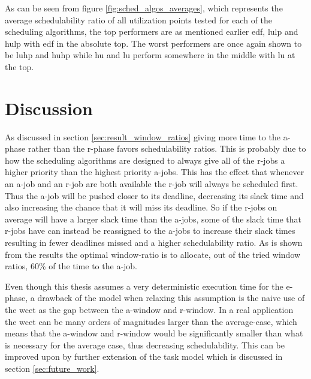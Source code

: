 \documentclass{kththesis}
\begin{document}
As can be seen from figure \ref{fig:sched_algos_averages}, which represents the average
schedulability ratio of all utilization points tested for each of the scheduling algorithms, the top
performers are as mentioned earlier \acrshort{edf}, \acrshort{lulp} and \acrshort{hulp} with
\acrshort{edf} in the absolute top. The worst performers are once again shown to be \acrshort{luhp}
and \acrshort{huhp} while \acrshort{hu} and \acrshort{lu} perform somewhere in the middle with \acrshort{lu}
at the top.


\chapter{Discussion} \label{ch:discussion}

As discussed in section \ref{sec:result_window_ratios} giving more time to the \acrshort{a}-phase
rather than the \acrshort{r}-phase favors schedulability ratios. This is probably due to how the
scheduling algorithms are designed to always give all of the \acrshort{r}-jobs a higher
priority than the highest priority \acrshort{a}-jobs. This has the effect that whenever an
\acrshort{a}-job and an \acrshort{r}-job are both available the \acrshort{r}-job will always be
scheduled first. Thus the \acrshort{a}-job will be pushed closer to its deadline, decreasing its
slack time and also increasing the chance that it will miss its deadline. So if the
\acrshort{r}-jobs on average will have a larger slack time than the \acrshort{a}-jobs, some of the
slack time that \acrshort{r}-jobs have can instead be reassigned to the \acrshort{a}-jobs to
increase their slack times resulting in fewer deadlines missed and a higher schedulability ratio. As
is shown from the results the optimal window-ratio is to allocate, out of the tried window ratios,
60\% of the time to the \acrshort{a}-job. 

Even though this thesis assumes a very deterministic
execution time for the \acrshort{e}-phase, a drawback of the model when relaxing this assumption is
the naive use of the \acrshort{wcet} as the gap between the \acrshort{a}-window and \acrshort{r}-window.
In a real application the \acrshort{wcet} can be many orders of magnitudes larger than the
average-case, which means that the \acrshort{a}-window and \acrshort{r}-window would be
significantly smaller than what is necessary for the average case, thus decreasing schedulability.
This can be improved upon by further extension of the task model which is discussed in section
\ref{sec:future_work}.
\end{document}
